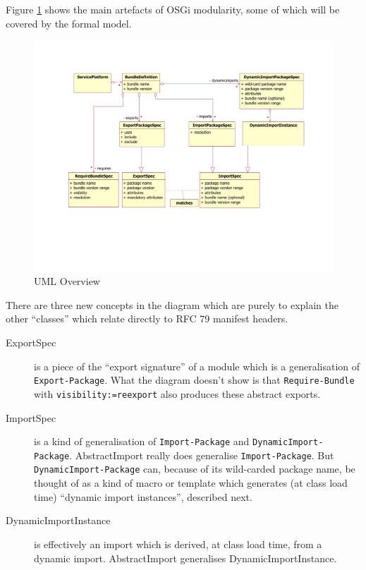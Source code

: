 \documentclass[a4paper,9pt]{article}
\begin{document}
Figure \ref{fig:uml} shows the main artefacts of OSGi modularity, some of
which will be covered by the formal model.

\begin{figure}[h!]
\includegraphics*[scale=0.5]{uml.pdf}
\caption{UML Overview}
\label{fig:uml}
\end{figure}

There are three new concepts in the diagram which are purely to explain the
other ``classes'' which relate directly to RFC 79 manifest headers.

\begin{description}
\item[ExportSpec] is a piece of the ``export signature'' of a module which
is a generalisation of \texttt{Export-Package}.
What the diagram doesn't show is that \texttt{Require-Bundle} with
\texttt{visibility:=reexport}
also produces these abstract exports.

\item[ImportSpec] is a kind of generalisation of
\texttt{Import-Package} and \texttt{DynamicImport-Package}.
AbstractImport really does generalise \texttt{Import-Package}.
But \texttt{DynamicImport-Package} can, because of its wild-carded package
name, be thought of as a kind of macro or template which generates
(at class load time) ``dynamic import instances'', described next.

\item[DynamicImportInstance] is effectively an import which is derived, at
class load time, from a dynamic import. AbstractImport generalises
DynamicImportInstance.
\end{description}
\end{document}
